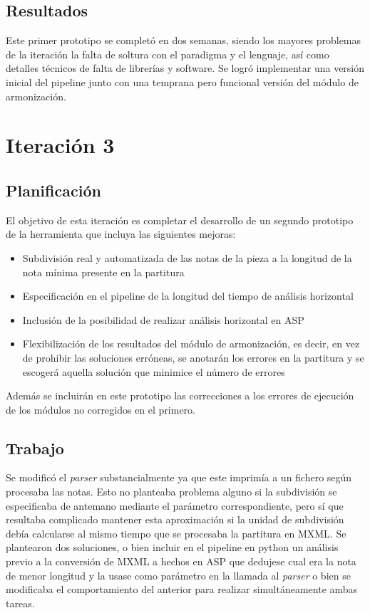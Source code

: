 \subsection{Resultados}
Este primer prototipo se completó en dos semanas, siendo los mayores problemas de la iteración la falta de soltura con el paradigma y el lenguaje, así como detalles técnicos de falta de librerías y software. Se logró implementar una versión inicial del pipeline junto con una temprana pero funcional versión del módulo de armonización.


\section{Iteración 3}

\subsection{Planificación}
El objetivo de esta iteración es completar el desarrollo de un segundo prototipo de la herramienta que incluya las siguientes mejoras:
\begin{itemize}
	\item Subdivisión real y automatizada de las notas de la pieza a la longitud de la nota mínima presente en la partitura
	\item Especificación en el pipeline de la longitud del tiempo de análisis horizontal
	\item Inclusión de la posibilidad de realizar análisis horizontal en ASP
	\item Flexibilización de los resultados del módulo de armonización, es decir, en vez de prohibir las soluciones erróneas, se anotarán los errores en la partitura y se escogerá aquella solución que minimice el número de errores
\end{itemize}
Además se incluirán en este prototipo las correcciones a los errores de ejecución de los módulos no corregidos en el primero.

\subsection{Trabajo}
Se modificó el \textit{parser} substancialmente ya que este imprimía a un fichero según procesaba las notas. Esto no planteaba problema alguno si la subdivisión se especificaba de antemano mediante el parámetro correspondiente, pero sí que resultaba complicado mantener esta aproximación si la unidad de subdivisión debía calcularse al mismo tiempo que se procesaba la partitura en MXML. Se plantearon dos soluciones, o bien incluir en el pipeline en python un análisis previo a la conversión de MXML a hechos en ASP que dedujese cual era la nota de menor longitud y la usase como parámetro en la llamada al \textit{parser} o bien se modificaba el comportamiento del anterior para realizar simultáneamente ambas tareas. 

